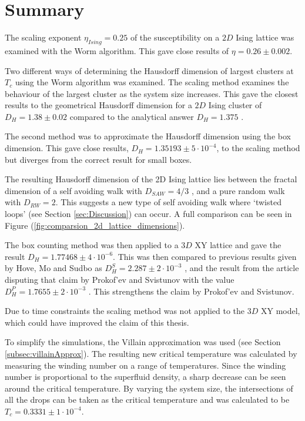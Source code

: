 \section{Summary}
\label{sec:Summary}

The scaling exponent $\eta_{Ising} = 0.25$ of the susceptibility on a $2D$ Ising lattice was examined with the Worm algorithm. This gave close results of $\eta = 0.26 \pm 0.002$.

Two different ways of determining the Hausdorff dimension of largest clusters at $T_c$ using the Worm algorithm was examined. The scaling method examines the behaviour of the largest cluster as the system size increases. This gave the closest results to the geometrical Hausdorff dimension for a $2D$ Ising cluster of $D_H = 1.38 \pm 0.02$ compared to the analytical answer $D_H = 1.375$ \cite{Duplantier:GeoHausdorff}.

The second method was to approximate the Hausdorff dimension using the box dimension. This gave close results, $D_H = 1.35193 \pm 5 \cdot 10^{-4}$, to the scaling method but diverges from the correct result for small boxes.

The resulting Hausdorff dimension of the 2D Ising lattice lies between the fractal dimension of a self avoiding walk with $D_{SAW} = 4/3$ \cite{Vilgis:FlorySAW}, and a pure random walk with $D_{RW} = 2$. This suggests a new type of self avoiding walk where `twisted loops' (see Section \ref{sec:Discussion}) can occur. A full comparison can be seen in Figure (\ref{fig:comparsion_2d_lattice_dimensions}).

The box counting method was then applied to a $3D$ XY lattice and gave the result $D_H = 1.77468 \pm 4 \cdot 10^{-6}$. This was then compared to previous results given by Hove, Mo and Sudbo as $D_H^S = 2.287 \pm 2 \cdot 10^{-3}$ \cite{Hove:hausdorff_crit_fluctuations}, and the result from the article disputing that claim by Prokof'ev and Svistunov with the value $D_H^P = 1.7655 \pm 2 \cdot 10^{-3}$ \cite{Prokofev:comment_on_hove_hausdorff_crit_fluct}. This strengthens the claim by Prokof'ev and Svistunov.

Due to time constraints the scaling method was not applied to the $3D$ XY model, which could have improved the claim of this thesis.

To simplify the simulations, the Villain approximation was used (see Section \ref{subsec:villainApprox}). The resulting new critical temperature was calculated by measuring the winding number on a range of temperatures. Since the winding number is proportional to the superfluid density, a sharp decrease can be seen around the critical temperature. By varying the system size, the intersections of all the drops can be taken as the critical temperature and was calculated to be $T_c = 0.3331 \pm 1 \cdot 10^{-4}$.

